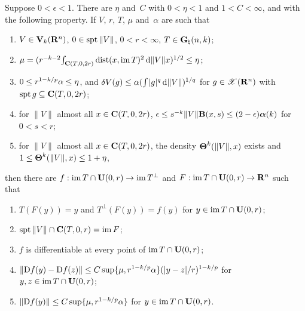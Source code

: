 \begin{theorem}
    \label{al:8.19}
    Suppose $0 < \epsilon < 1$. There are $\eta$ and~$C$ with $0 < \eta < 1$ and $1 < C < \infty$,
    and with the following property. If $V$, $r$, $T$, $\mu$ and~$\alpha$ are such that
    \begin{enumerate}[label=(\arabic*)]
        \item \label{al:8.19(1)} $V \in \mathbf{V}_{k}(\mathbf{R}^{n})$, $0 \in \operatorname{spt} \|V\|$, $0 < r <
            \infty$, $T \in \mathbf{G}_{\natural}(n,k)$;
        \item \label{al:8.19(2)} $\mu = (r^{-k-2} {\textstyle\int_{\mathbf{C} ( T, 0, 2r )}^{}} \operatorname{dist}(x, \operatorname{im} T)^2
            \,\mathrm{d} \|V\| x)^{1/2} \le \eta$;
        \item \label{al:8.19(3)} $0 \le r^{1 - k/p} \alpha \le \eta$, and $\delta V(g) \le \alpha
            ({\textstyle\int_{}^{}} |g|^q \,\mathrm{d} \|V\|)^{1/q}$ for $g \in \mathscr{X}(\mathbf{R}^{n})$ with $\operatorname{spt} g \subseteq
            \mathbf{C} ( T, 0, 2r )$;
        \item \label{al:8.19(4)} for $\|V\|$ almost all $x \in \mathbf{C} ( T, 0, 2r )$, $\epsilon \le
            s^{-k} \|V\| \mathbf{B}(x,s) \le (2 - \epsilon) \boldsymbol{\alpha}(k)$ for $0 < s < r$;
        \item \label{al:8.19(5)} for $\|V\|$ almost all $x \in \mathbf{C} ( T, 0, 2r )$, the density
            $\boldsymbol{\Theta}^{k}(\|V\|,x)$ exists and $1 \le \boldsymbol{\Theta}^{k}(\|V\|,x) \le 1 + \eta$,
    \end{enumerate}
    then there are $f : \operatorname{im} T \cap \mathbf{U}(0,r) \to \operatorname{im} T^\perp$ and $F : \operatorname{im} T \cap \mathbf{U}(0,r)
    \to \mathbf{R}^{n}$ such that
    \begin{enumerate}[label=(\arabic*),start=6]
        \item \label{al:8.19(6)} $T(F(y)) = y$ and $T^\perp(F(y)) = f(y)$ for $y \in \operatorname{im} T \cap
            \mathbf{U}(0,r)$;
        \item \label{al:8.19(7)} $\operatorname{spt} \|V\| \cap \mathbf{C} ( T, 0, r ) = \operatorname{im} F$;
        \item \label{al:8.19(8)} $f$ is differentiable at every point of $\operatorname{im} T \cap \mathbf{U}(0,r)$;
        \item \label{al:8.19(9)} $\|\mathrm{D} f(y) - \mathrm{D} f(z)\| \le C \sup \{ \mu, r^{1 - k/p} \alpha
            \} (|y - z|/r)^{1 - k/p}$ for $y, z \in \operatorname{im} T \cap \mathbf{U}(0,r)$;
        \item \label{al:8.19(10)} $\|\mathrm{D} f(y)\| \le C \sup \{ \mu, r^{1 - k/p} \alpha \}$ for $y
            \in \operatorname{im} T \cap \mathbf{U}(0,r)$.
    \end{enumerate}
\end{theorem}

